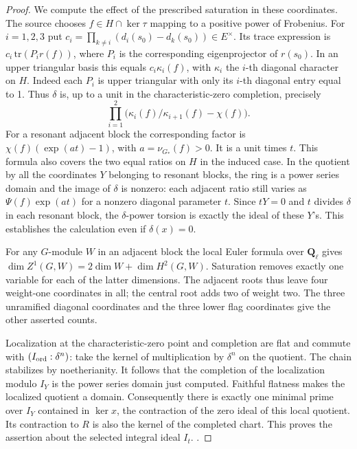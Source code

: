\begin{proof}
We compute the effect of the prescribed saturation in these
coordinates. The source chooses \(f\in H\cap\ker\tau\) mapping to
a positive power of Frobenius. For \(i=1,2,3\) put
\(c_i=\prod_{k\ne i}(d_i(s_0)-d_k(s_0))\in E^\times\).
Its trace expression is \(c_i\,\mathrm{tr}(P_i r(f))\), where
\(P_i\) is the corresponding eigenprojector of \(r(s_0)\). In an
upper triangular basis this equals \(c_i\kappa_i(f)\), with
\(\kappa_i\) the \(i\)-th diagonal character on \(H\). Indeed each
\(P_i\) is upper triangular with only its \(i\)-th diagonal entry
equal to 1. Thus \(\delta\) is, up to a unit in the characteristic-zero
completion, precisely
\[
  \prod_{i=1}^2\bigl(\kappa_i(f)/\kappa_{i+1}(f)-\chi(f)\bigr).
\]
For a resonant adjacent block the corresponding factor is
\(\chi(f)(\exp(a t)-1)\), with \(a=\nu_{G_*}(f)>0\).
It is a unit times \(t\). This formula also covers the two equal
ratios on \(H\) in the induced case. In the quotient by all the
coordinates \(Y\) belonging to resonant blocks, the ring is a
power series domain and the image of \(\delta\) is nonzero:
each adjacent ratio still varies as
\(\Psi(f)\exp(a t)\) for a nonzero diagonal parameter \(t\).
Since \(tY=0\) and \(t\) divides \(\delta\) in each resonant
block, the \(\delta\)-power torsion is exactly the ideal of these
\(Y\)'s. This establishes the calculation even if \(\delta(x)=0\).

For any \(G\)-module \(W\) in an adjacent block the local Euler
formula over \(\mathbf Q_\ell\) gives
\(\dim Z^1(G,W)=2\dim W+\dim H^2(G,W)\).
Saturation removes exactly one variable for each of the latter
dimensions. The adjacent roots thus leave four weight-one
coordinates in all; the central root adds two of weight two.
The three unramified diagonal coordinates and the three lower flag
coordinates give the other asserted counts.

Localization at the characteristic-zero point and completion are
flat and commute with \((I_{\rm ord}:\delta^n)\): take the kernel
of multiplication by \(\delta^n\) on the quotient. The chain
stabilizes by noetherianity. It follows that the completion of the
localization modulo \(I_Y\) is the power series domain just computed.
Faithful flatness makes the localized quotient a domain.
Consequently there is exactly one minimal prime over \(I_Y\)
contained in \(\ker x\), the contraction of the zero ideal of this
local quotient. Its contraction to \(R\) is also the kernel of the
completed chart. This proves the assertion about the selected
integral ideal \(I_t\).
.
\end{proof}

